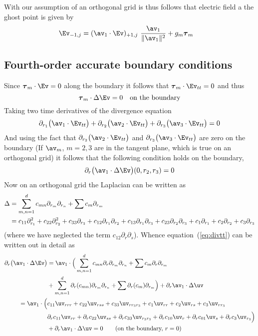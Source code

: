 \documentclass[10pt]{article}
\newcommand{\rc}{{r_3}}%
\begin{document}
With our assumption of an orthogonal grid is thus follows that electric field a the 
ghost point is given by
\begin{align*}
\Ev_{-1,j} &= (\av_1\cdot\Ev)_{+1,j} ~{\av_1\over \| \av_1 \|^2} + g_m \tauv_m
\end{align*}


\subsection{Fourth-order accurate boundary conditions}

Since $\tauv_m\cdot \Ev=0$ along the boundary it follows that $\tauv_m\cdot \Ev_{tt}=0$ and thus
\[
   \tauv_m \cdot\Delta \Ev = 0 \quad\mbox{on the boundary}
\]
Taking two time derivatives of the divergence equation
\[
  \pra\big(\av_1\cdot \Ev_{tt} \big) + \prb\big(\av_2\cdot \Ev_{tt}\big) + \prc\big(\av_3\cdot \Ev_{tt}  \big) =0 
\]
And using the fact that $\prb\big(\av_2\cdot \Ev_{tt}\big)$ and 
$\prc\big(\av_3\cdot \Ev_{tt}\big)$ are zero on the boundary
(If $\av_m$, $m=2,3$ are in the tangent plane, which is true on an orthogonal grid) it follows that
the following condition holds on the boundary,
\begin{equation}
  \partial_r\big(\av_1\cdot \Delta\Ev \big) (0,r_2,r_3) =0   \label{eq:divtt}
\end{equation}
Now on an orthogonal grid the Laplacian can be written as
\begin{align}
   \Delta  &= \sum_{m,n=1}^d  c_{mn} \partial_{r_m}\partial_{r_n} + \sum c_m \partial_{r_m} \\
           &= c_{11} \partial_{r_1}^2 + c_{22}\partial_{r_2}^2 + c_{33}\partial_{r_3}  + 
              c_{12} \partial_{r_1}\partial_{r_2} + c_{13}\partial_{r_1}\partial_{r_3} + c_{23}\partial_{r_2}\partial_{r_3}  +
              c_{1} \partial_{r_1} + c_{2} \partial_{r_2}+ c_{3} \partial_{r_3}
\end{align}
(where we have neglected the term $c_{12}\partial_r\partial_s$).
Whence equation~(\ref{eq:divtt}) can be written out in detail as
\begin{align}
   \partial_r\big(\av_1\cdot \Delta\Ev \big) &= 
  \av_1\cdot\Big( \sum_{m,n=1}^d  c_{mn} \partial_r\partial_{r_m}\partial_{r_n} 
                   + \sum c_m \partial_r\partial_{r_m} \label{eq:DrADotuv} \\
 ~~~&+ \sum_{m,n=1}^d  \partial_r(c_{mn}) \partial_{r_m}\partial_{r_n} + \sum \partial_r(c_m) \partial_{r_m} \Big) 
   +  \partial_r\av_1\cdot \Delta\uv \\
=  \av_1\cdot\Big( &c_{11} \uv_{rrr} + c_{22}\uv_{rss} + c_{33}\uv_{r\rc\rc} 
             + c_{1}\uv_{rr} + c_{2}\uv_{rs} + c_{3}\uv_{r\rc}  \label{eq:divtte}\\
                  &\partial_r c_{11} \uv_{rr} + \partial_r c_{22}\uv_{ss} + \partial_r c_{33}\uv_{\rc\rc} 
                   + \partial_r c_{10}\uv_{r} + \partial_r c_{01}\uv_{s}+ \partial_r c_{3}\uv_{\rc} \Big) \\
   &  + \partial_r\av_1\cdot \Delta\uv = 0 \qquad\mbox{(on the boundary, $r=0$)}
\end{align}
\end{document}
